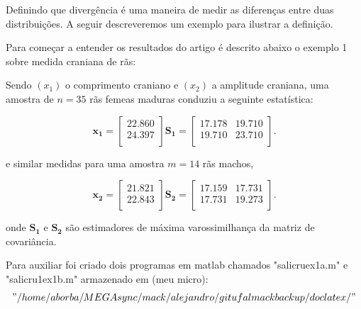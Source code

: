 \documentclass[12pt,a4paper]{article}
\begin{document}
Definindo que divergência é uma maneira de medir as diferenças entre duas distribuições. A seguir descreveremos um exemplo para ilustrar a definição.

Para começar a entender os resultados do artigo \cite{salicru_pardo_1994} é descrito abaixo o exemplo 1 sobre medida craniana de rãs:

Sendo $(x_1)$ o comprimento craniano e $(x_2)$ a amplitude craniana, uma amostra de $n=35$ rãs femeas maduras conduziu a seguinte estatística:

$$
\mathbf{x_1} = \left[
\begin{array}{c}
	22.860   \\
	24.397   \\
\end{array}
\right]
\mathbf{S_1} = \left[
\begin{array}{cc}
	 17.178  & 19.710   \\
         19.710  & 23.710   \\
\end{array}
\right].
$$

e similar medidas para uma amostra $m=14$ rãs machos, 

$$
\mathbf{x_2} = \left[
\begin{array}{c}
	21.821  \\
	22.843   \\
\end{array}
\right]
\mathbf{S_2} = \left[
\begin{array}{cc}
	 17.159  & 17.731   \\
         17.731  & 19.273   \\
\end{array}
\right].
$$

onde $\mathbf{S_1}$ e $\mathbf{S_2}$ são estimadores de máxima varossimilhança da matriz de covariância.

Para auxiliar foi criado dois programas em matlab chamados "salicruex1a.m" e "salicru1ex1b.m" armazenado em (meu micro): $$"/home/aborba/MEGAsync/mack/alejandro/gitufalmackbackup/doclatex/"$$
\end{document}
